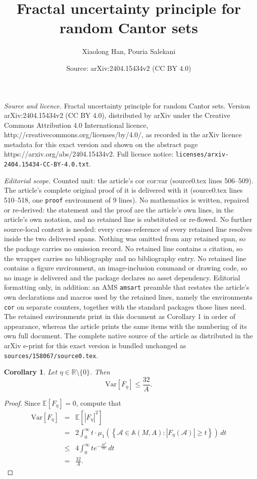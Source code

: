 \documentclass[10pt,a4paper]{amsart}
\title{Fractal uncertainty principle for random Cantor sets}
\author{Xiaolong Han, Pouria Salekani}
\date{Source: arXiv:2404.15434v2 (CC BY 4.0)}
\newtheorem{cor}{Corollary}
\newcommand\Ab{\mathbb{A}}
\newcommand\Ac{\mathcal{A}}
\newcommand\E{\mathbb{E}}
\newcommand\R{\mathbb{R}}
\newcommand\Var{\mathrm{Var}}
\begin{document}
\maketitle

\noindent\emph{Source and licence.} Fractal uncertainty principle for random Cantor sets. Version arXiv:2404.15434v2 (CC BY 4.0), distributed by arXiv under the Creative Commons Attribution 4.0 International licence, http://creativecommons.org/licenses/by/4.0/, as recorded in the arXiv licence metadata for this exact version and shown on the abstract page https://arxiv.org/abs/2404.15434v2. Full licence notice: \texttt{licenses/arxiv-2404.15434-CC-BY-4.0.txt}.\par\smallskip

\noindent\textit{Editorial scope.} Counted unit: the article's cor cor:var (source0.tex lines 506--509). The article's complete original proof of it is delivered with it (source0.tex lines 510--518, one \texttt{proof} environment of 9 lines). No mathematics is written, repaired or re-derived: the statement and the proof are the article's own lines, in the article's own notation, and no retained line is substituted or re-flowed.  No further source-local context is needed: every cross-reference of every retained line resolves inside the two delivered spans.  Nothing was omitted from any retained span, so the package carries no omission record.  No retained line contains a citation, so the wrapper carries no bibliography and no bibliography entry.  No retained line contains a figure environment, an image-inclusion command or drawing code, so no image is delivered and the package declares no asset dependency.  Editorial formatting only, in addition: an AMS \texttt{amsart} preamble that restates the article's own declarations and macros used by the retained lines, namely the environments \texttt{cor} on separate counters, together with the standard packages those lines need.  The retained environments print in this document as Corollary 1 in order of appearance, whereas the article prints the same items with the numbering of its own full document.  The complete native source of the article as distributed in the arXiv e-print for this exact version is bundled unchanged as \texttt{sources/158067/source0.tex}.
\begin{cor}\label{cor:var}
Let $\eta\in\R\setminus\{0\}$. Then
$$\Var\left[F_\eta\right]\le\frac{32}{A}.$$
\end{cor}

\begin{proof}
Since $\E[F_\eta]=0$, compute that
\begin{eqnarray*}
\Var\left[F_\eta\right]&=&\E\left[\left|F_\eta\right|^2\right]\\
&=&2\int_0^\infty t\cdot\mu_1\left(\left\{\Ac\in\Ab(M,A):\left|F_\eta(\Ac)\right|\ge t\right\}\right)\,dt\\
&\le&4\int_0^\infty te^{-\frac{At^2}{16}}\,dt\\
&=&\frac{32}{A}.
\end{eqnarray*}
\end{proof}
\end{document}
